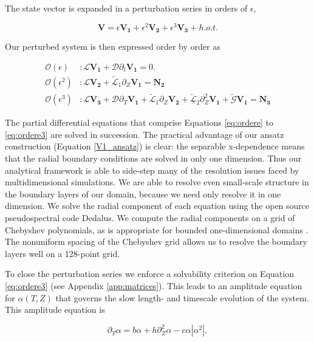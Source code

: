 \documentclass[twocolumn]{aastex61}
\newcommand{\beq}{\begin{equation}}
\newcommand{\eeq}{\end{equation}}
\begin{document}
The state vector is expanded in a perturbation series in orders of $\epsilon$,

\beq
\label{eq:pert_exp}
\mathbf{V} = \epsilon\mathbf{V_1} + \epsilon^2\mathbf{V_2} + \epsilon^3\mathbf{V_3} + h.o.t.
\eeq

Our perturbed system is then expressed order by order as

\begin{eqnarray}
\mathcal{O}(\epsilon)&: \mathcal{L}\mathbf{V_1} + \mathcal{D}\partial_t \mathbf{V_1} = 0. \label{eq:ordere}\\
\mathcal{O}(\epsilon^2)&: \mathcal{L}\mathbf{V_2} + \widetilde{\mathcal{L}}_1 \partial_Z \mathbf{V_1} = \mathbf{N_2} \label{eq:ordere2}\\
\mathcal{O}(\epsilon^3)&: \mathcal{L} \mathbf{V_3} + \mathcal{D}\partial_T \mathbf{V_1}  + \widetilde{\mathcal{L}}_1\partial_Z\mathbf{V_2} + \widetilde{\mathcal{L}}_2\partial_Z^2\mathbf{V_1} + \widetilde{\mathcal{G}}\mathbf{V_1} = \mathbf{N_3} \label{eq:ordere3}
\end{eqnarray}

The partial differential equations that comprise Equations \ref{eq:ordere} to \ref{eq:ordere3} are solved in succession. The practical advantage of our ansatz construction (Equation \ref{V1_ansatz}) is clear: the separable x-dependence means that the radial boundary conditions are solved in only one dimension. Thus our analytical framework is able to side-step many of the resolution issues faced by multidimensional simulations. We are able to resolve even small-scale structure in the boundary layers of our domain, because we need only resolve it in one dimension. We solve the radial component of each equation using the open source pseudospectral code Dedalus. We compute the radial components on a grid of Chebyshev polynomials, as is appropriate for bounded one-dimensional domains \citep[e.g.]{Boyd:2001aa}. The nonuniform spacing of the Chebyshev grid allows us to resolve the boundary layers well on a 128-point grid.

To close the perturbation series we enforce a solvability criterion on Equation \ref{eq:ordere3} (see Appendix \ref{app:matrices}). This leads to an amplitude equation for $\alpha(T, Z)$ that governs the slow length- and timescale evolution of the system. This amplitude equation is 

\beq
\label{eq:gle}
\partial_T \alpha = b \alpha + h \partial_Z^2 \alpha - c \alpha \left|\alpha^2\right|,
\eeq
\end{document}
